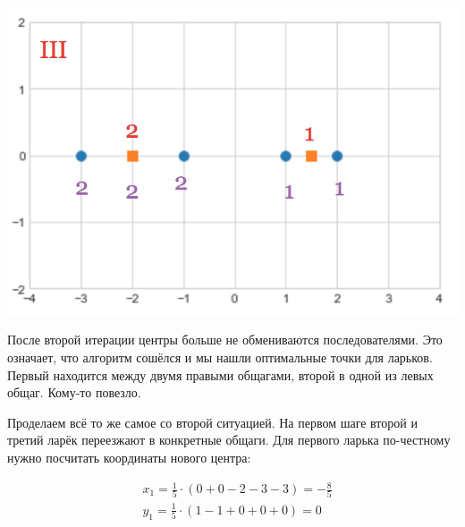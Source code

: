 \documentclass[12pt, a4paper, oneside]{article}
\begin{document}
{\begin{enumerate}
\begin{center}
	\includegraphics[scale=0.25]{k_means_a3.png}
\end{center}

После второй итерации центры больше не обмениваются последователями. Это означает, что алгоритм сошёлся и мы нашли оптимальные точки для ларьков. Первый находится между двумя правыми общагами, второй в одной из левых общаг. Кому-то повезло.  

Проделаем всё то же самое со второй ситуацией.  На первом шаге второй и третий ларёк переезжают в конкретные общаги. Для первого ларька по-честному нужно посчитать координаты нового центра: 

\begin{equation}
\begin{aligned}
& x_1 = \frac{1}{5} \cdot (0 + 0 -2 -3 -3) = - \frac{8}{5} \\ 
& y_1 = \frac{1}{5} \cdot (1 - 1 + 0 + 0 + 0 ) = 0 \\ 
\end{aligned}
\end{equation}
	


\end{enumerate}}
\end{document}
